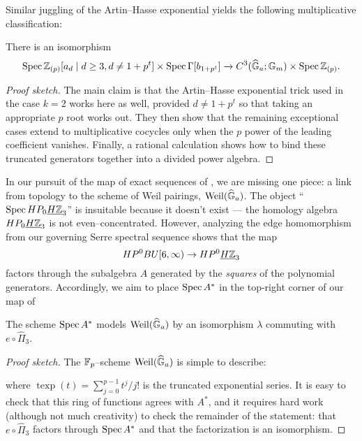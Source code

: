 \noindent Similar juggling of the Artin--Hasse exponential yields the following multiplicative classification:
\begin{theorem}
There is an isomorphism \[\operatorname{Spec} \mathbb Z_{(p)}[a_d \mid d \ge 3, d \ne 1 + p^t] \times \operatorname{Spec} \Gamma[b_{1 + p^t}] \xrightarrow{} C^3(\widehat{\mathbb G}_a; \mathbb G_m) \times \operatorname{Spec} \mathbb Z_{(p)}.\]
\end{theorem}
\begin{proof}[Proof sketch]
The main claim is that the Artin--Hasse exponential trick used in the case $k = 2$ works here as well, provided $d \ne 1 + p^t$ so that taking an appropriate $p${\th} root works out.  They then show that the remaining exceptional cases extend to multiplicative cocycles only when the $p${\th} power of the leading coefficient vanishes.  Finally, a rational calculation shows how to bind these truncated generators together into a divided power algebra.
\end{proof}

In our pursuit of the map of exact sequences of , we are missing one piece: a link from topology to the scheme of Weil pairings, $\operatorname{Weil}(\widehat{\mathbb G}_a)$.  The object ``$\operatorname{Spec} HP_0 \underline{\smash{H\mathbb Z}}_{3}$'' is insuitable because it doesn't exist --- the homology algebra $HP_0 \underline{\smash{H\mathbb Z}}_{3}$ is not even--concentrated.  However, analyzing the edge homomorphism from our governing Serre spectral sequence shows that the map \[HP^0 BU[6, \infty) \to HP^0 \underline{\smash{H\mathbb Z}}_{3}\] factors through the subalgebra $A$ generated by the \emph{squares} of the polynomial generators.  Accordingly, we aim to place $\operatorname{Spec} A^*$ in the top-right corner of our map of 

\begin{lemma}
The scheme $\operatorname{Spec} A^*$ models $\operatorname{Weil}(\widehat{\mathbb G}_a)$ by an isomorphism $\lambda$ commuting with $e \circ \hat \Pi_3$.
\end{lemma}
\begin{proof}[Proof sketch]
The $\mathbb F_p$--scheme $\operatorname{Weil}(\widehat{\mathbb G}_a)$ is simple to describe:
\begin{center}
\end{center}
where $\operatorname{texp}(t) = \sum_{j=0}^{p-1} t^j / j!$ is the truncated exponential series.  It is easy to check that this ring of functions agrees with $A^*$, and it requires hard work (although not much creativity) to check the remainder of the statement: that $e \circ \hat \Pi_3$ factors through $\operatorname{Spec} A^*$ and that the factorization is an isomorphism.
\end{proof}

